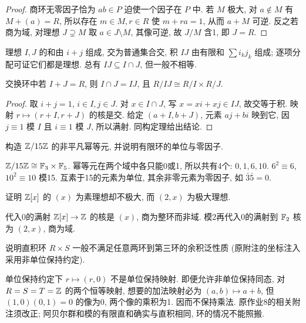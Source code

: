 \begin{proof}
商环无零因子恰为 $ab\in P$ 迫使一个因子在 $P$ 中. 若 $M$ 极大, 对 $a\notin M$ 有 $M+(a)=R$, 所以存在 $m\in M,r\in R$ 使 $m+ra=1$, 从而 $a+M$ 可逆. 反之若商为域, 对理想 $J\supsetneq M$ 取 $a\in J\setminus M$, 其像可逆, 故 $J/M$ 含1, 即 $J=R$.
\end{proof}
理想 $I,J$ 的和由 $i+j$ 组成, 交为普通集合交, 积 $IJ$ 由有限和 $\sum i_kj_k$ 组成; 逐项分配可证它们都是理想. 总有 $IJ\subseteq I\cap J$, 但一般不相等.
\begin{theorem}[中国剩余]\label{thm:crt}
交换环中若 $I+J=R$, 则 $I\cap J=IJ$, 且 $R/IJ\cong R/I\times R/J$.
\end{theorem}
\begin{proof}
取 $i+j=1$, $i\in I,j\in J$. 对 $x\in I\cap J$, 写 $x=xi+xj\in IJ$, 故交等于积. 映射 $r\mapsto(r+I,r+J)$ 的核是交. 给定 $(a+I,b+J)$, 元素 $aj+bi$ 映到它, 因 $j\equiv1$ 模 $I$ 且 $i\equiv1$ 模 $J$, 所以满射. 同构定理给出结论.
\end{proof}
\begin{example}构造 $\mathbb Z/15\mathbb Z$ 的非平凡幂等元, 并说明有限环的单位与零因子.\end{example}
\begin{solution}
$\mathbb Z/15\mathbb Z\cong\mathbb F_3\times\mathbb F_5$. 幂等元在两个域中各只能0或1, 所以共有4个: $0,1,6,10$. $6^2\equiv6$, $10^2\equiv10$ 模15. 互素于15的元素为单位, 其余非零元素为零因子, 如 $\bar3\bar5=0$.
\end{solution}
\begin{exercise}证明 $\mathbb Z[x]$ 的 $(x)$ 为素理想却不极大, 而 $(2,x)$ 为极大理想.\end{exercise}
\begin{solution}
代入0的满射 $\mathbb Z[x]\to\mathbb Z$ 的核是 $(x)$, 商为整环而非域. 模2再代入0的满射到 $\mathbb F_2$ 核为 $(2,x)$, 商为域.
\end{solution}
\begin{exercise}说明直积环 $R\times S$ 一般不满足任意两环到第三环的余积泛性质 (原附注的坐标注入采用非单位保持约定).\end{exercise}
\begin{solution}
单位保持约定下 $r\mapsto(r,0)$ 不是单位保持映射. 即便允许非单位保持同态, 对 $R=S=T=\mathbb Z$ 的两个恒等映射, 想要的加法映射必为 $(a,b)\mapsto a+b$, 但 $(1,0)(0,1)=0$ 的像为0, 两个像的乘积为1. 因而不保持乘法. 原作业8的相关附注须改正; 阿贝尔群和模的有限直和确实与直积相同, 环的情况不能照搬.
\end{solution}
